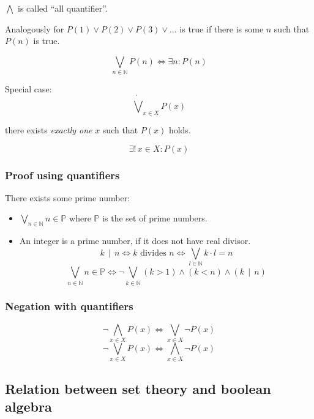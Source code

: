 \documentclass[a4paper,landscape,twocolumn]{article}
\newcommand\divides[2]{#1\,\mid\,#2}
\begin{document}
$\bigwedge$ is called \enquote{all quantifier}.

Analogously for $P(1) \lor P(2) \lor P(3) \lor \ldots$ is true if there is some $n$ such that $P(n)$ is true.

\[ \bigvee_{n \in \mathbb{N}} P(n) \iff \exists n: P(n) \]

Special case:
\[ \dot\bigvee_{x \in X} P(x) \]

there exists \emph{exactly one} $x$ such that $P(x)$ holds.

\[ \exists! \, x \in X: P(x) \]

\subsubsection{Proof using quantifiers}

There exists some prime number:

\begin{itemize}
  \item $\bigvee_{n \in \mathbb{N}} n \in \mathbb{P}$
        where $\mathbb{P}$ is the set of prime numbers.
  \item An integer is a prime number, if it does not have real divisor.
        \[
            \divides{k}{n} \iff \text{$k$ divides $n$}
            \iff \bigvee_{l \in \mathbb{N}} k\cdot l = n
        \] \[
            \bigvee_{n \in \mathbb{N}} n \in \mathbb{P}
              \iff \neg \bigvee_{k \in \mathbb{N}} (k > 1) \land (k < n) \land (\divides{k}{n})
        \]
\end{itemize}

\subsubsection{Negation with quantifiers}
%
\[ \neg \bigwedge_{x \in X} P(x) \iff \bigvee_{x \in X} \neg P(x) \]
\[ \neg \bigvee_{x \in X} P(x) \iff \bigwedge_{x \in X} \neg P(x) \]

\subsection{Relation between set theory and boolean algebra}
\end{document}
